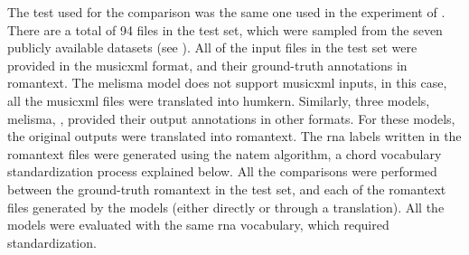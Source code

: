 
The test used for the comparison was the same one used in
the experiment of .
There are a total of 94 files in the test set, which were
sampled from the seven publicly available datasets (see
). All of the input files
in the test set were provided in the \gls{musicxml} format,
and their ground-truth annotations in \gls{romantext}. The
\gls{melisma} model does not support \gls{musicxml} inputs,
in this case, all the \gls{musicxml} files were translated
into \gls{humkern}. Similarly, three models, \gls{melisma},
\textcite{chen2021attend, mcleod2021modular}, provided their
output annotations in other formats. For these models, the
original outputs were translated into \gls{romantext}. The
\gls{rna} labels written in the \gls{romantext} files were
generated using the \gls{natem} algorithm, a chord
vocabulary standardization process explained below. All the
comparisons were performed between the ground-truth
\gls{romantext} in the test set, and each of the
\gls{romantext} files generated by the models (either
directly or through a translation). All the models were
evaluated with the same \gls{rna} vocabulary, which required
standardization.
